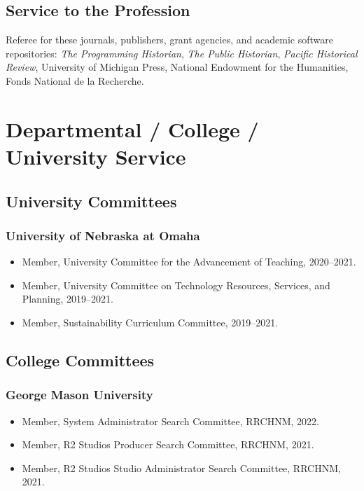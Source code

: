 \documentclass[10pt]{article}
\begin{document}
\subsection*{Service to the Profession}

Referee for these journals, publishers, grant agencies, and academic software repositories: \textit{The Programming Historian}, \textit{The Public Historian}, \textit{Pacific Historical Review}, University of Michigan Press, National Endowment for the Humanities, Fonds National de la Recherche.

\vspace{.4cm}

\section{Departmental / College / University Service}

\subsection{University Committees}

\subsubsection*{University of Nebraska at Omaha}

\begin{itemize}
  \item Member, University Committee for the Advancement of Teaching, 2020--2021.
  \item Member, University Committee on Technology Resources, Services, and Planning, 2019--2021.
  \item Member, Sustainability Curriculum Committee, 2019--2021.
\end{itemize}

\subsection{College Committees}

\subsubsection*{George Mason University}

\begin{itemize}
  \item Member, System Administrator Search Committee, RRCHNM, 2022.
  \item Member, R2 Studios Producer Search Committee, RRCHNM, 2021.
  \item Member, R2 Studios Studio Administrator Search Committee, RRCHNM, 2021.
\end{itemize}
\end{document}
